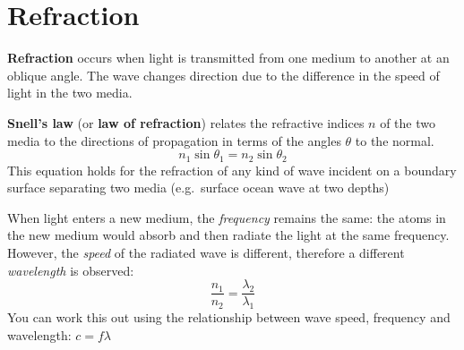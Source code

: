 %
%
%
%
%
%
%
\section{Refraction}

\textbf{Refraction} occurs when light is transmitted from one medium to another
at an oblique angle. The wave changes direction due to the difference in the
speed of light in the two media.

\textbf{Snell's law} (or \textbf{law of refraction}) relates the refractive
indices $n$ of the two media to the directions of propagation in terms of the
angles $\theta$ to the normal.
\begin{equation}
  \boxed{n_1\sin\theta_1=n_2\sin\theta_2}
\end{equation}
This equation holds for the refraction of any kind of wave incident on a
boundary surface separating two media (e.g.\ surface ocean wave at two depths)

%
%
%
%
%
%
%
%
%
%
When light enters a new medium, the \emph{frequency} remains the same: the
atoms in the new medium would absorb and then radiate the light at the same
frequency. However, the \emph{speed} of the radiated wave is different,
therefore a different \emph{wavelength} is observed: 
\begin{equation}
  \boxed{\frac{n_1}{n_2}=\frac{\lambda_2}{\lambda_1}}
\end{equation}
You can work this out using the relationship between wave speed, frequency
and wavelength: $c=f\lambda$

